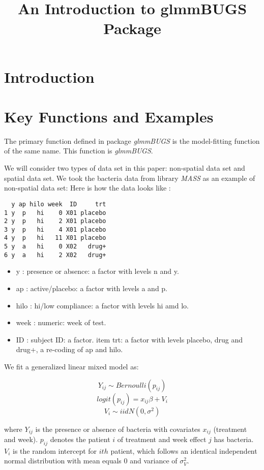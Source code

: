 \documentclass{article}
\title{An Introduction to glmmBUGS Package}
\begin{document}
\maketitle

\large
\section{Introduction}
 


\section{Key Functions and Examples}
The primary function defined in package \textit{glmmBUGS} is the model-fitting function of the same name.
This function is \textit{glmmBUGS}. 

We will consider two types of data set in this paper: non-spatial data set and spatial data set. 
We took the bacteria data from library \textit{MASS} as an example of non-spatial data set: 
Here is how the data looks like : 
\begin{verbatim}
  y ap hilo week  ID     trt
1 y  p   hi    0 X01 placebo
2 y  p   hi    2 X01 placebo
3 y  p   hi    4 X01 placebo
4 y  p   hi   11 X01 placebo
5 y  a   hi    0 X02   drug+
6 y  a   hi    2 X02   drug+
\end{verbatim}
\begin{itemize}
\item y : presence or absence: a factor with levels n and y. 
\item ap : active/placebo: a factor with levels a and p. 
\item hilo : hi/low compliance: a factor with levels hi amd lo. 
\item week : numeric: week of test. 
\item ID : subject ID: a factor. 
item trt: a factor with levels placebo, drug and drug+, a re-coding of ap and hilo. 
\end{itemize} 

We fit a generalized linear mixed model as: 

\[Y_{ij} \sim  Bernoulli(p_{ij})\]
\[logit(p_{ij}) = x_{ij}\beta + V_{i}\]
\[V_{i} \sim iid N(0, \sigma^2)\] 

where $Y_{ij}$ is the presence or absence of bacteria with covariates $x_{ij}$ (treatment and week).  
$p_{ij}$ denotes the patient $i$ of treatment and week effect $j$ has bacteria.
$V_i$ is the random intercept for $ith$ patient, which follows an identical independent normal distribution with mean equals 0 and variance of $\sigma_V^2$.
\end{document}
